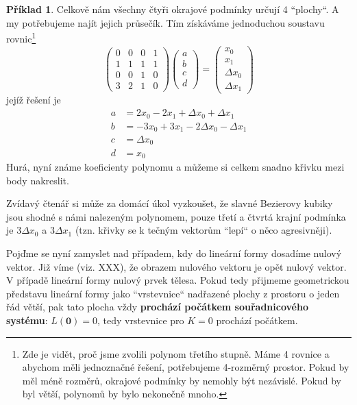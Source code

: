\documentclass[a5paper,12pt]{amsbook}
\theoremstyle{definition}
\newtheorem{example}{Příklad}[chapter]
\newcommand{\myscalar}[1]{#1}
\newcommand{\myvec}[1]{\mathbf{#1}}
\newcommand{\mymap}[1]{#1}
\begin{document}
\begin{example}
Celkově nám všechny čtyři okrajové podmínky určují 4 ``plochy``. A my potřebujeme najít jejich
průsečík. Tím získáváme jednoduchou soustavu rovnic\footnote{
  Zde je vidět, proč jsme zvolili polynom třetího stupně. Máme 4 rovnice a abychom měli
  jednoznačné řešení, potřebujeme 4-rozměrný prostor. Pokud by měl méně rozměrů, okrajové
  podmínky by nemohly být nezávislé. Pokud by byl větší, polynomů by bylo nekonečně mnoho.
}
\begin{equation*}
\left(\begin{array}{cccc}
0 & 0 & 0 & 1\\
1 & 1 & 1 & 1\\
0 & 0 & 1 & 0\\
3 & 2 & 1 & 0
\end{array}\right)\left(\begin{array}{c}
a\\
b\\
c\\
d
\end{array}\right)=\left(\begin{array}{c}
x_0\\
x_1\\
\Delta x_0\\
\Delta x_1
\end{array}\right)
\end{equation*}
jejíž řešení je
\begin{equation*}
\begin{split}
a &= 2x_0 - 2x_1 + \Delta x_0 + \Delta x_1\\
b &= -3x_0 + 3x_1 - 2\Delta x_0 - \Delta x_1\\
c &= \Delta x_0\\
d &= x_0
\end{split}
\end{equation*}
Hurá, nyní známe koeficienty polynomu a můžeme si celkem snadno křivku mezi body nakreslit.

Zvídavý čtenář si může za domácí úkol vyzkoušet, že slavné Bezierovy kubiky jsou shodné s námi
nalezeným polynomem, pouze třetí a čtvrtá krajní podmínka je $3\Delta x_0$ a $3\Delta x_1$ (tzn.
křivky se k tečným vektorům ``lepí`` o něco agresivněji).

\end{example}

\noindent Pojďme se nyní zamyslet nad případem, kdy do lineární formy dosadíme nulový vektor. Již víme
(viz. XXX), že obrazem nulového vektoru je opět nulový vektor. V případě lineární formy nulový
prvek tělesa. Pokud tedy přijmeme geometrickou představu lineární formy jako ``vrstevnice``
nadřazené plochy z prostoru o jeden řád větší, pak tato plocha vždy \textbf{prochází počátkem
souřadnicového systému}: $\mymap{L}(\myvec{0}) = \myscalar{0}$, tedy vrstevnice pro $K = 0$ prochází
počátkem.
\end{document}
